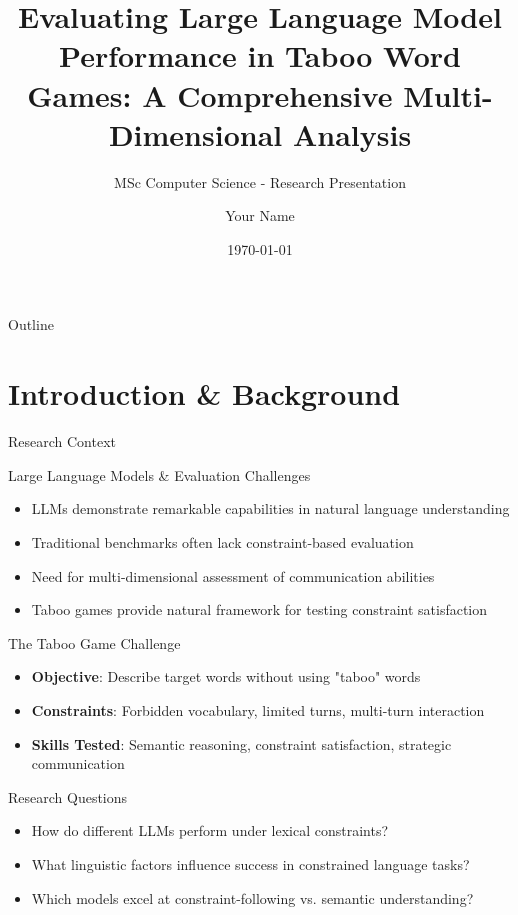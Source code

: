 \documentclass[aspectratio=169]{beamer}
\title[LLM Performance in Taboo Games]{Evaluating Large Language Model Performance in Taboo Word Games: A Comprehensive Multi-Dimensional Analysis}
\subtitle{MSc Computer Science - Research Presentation}
\author{Your Name}
\institute{University Name}
\date{\today}
\begin{document}
\begin{frame}
\titlepage
\end{frame}

\begin{frame}{Outline}
\tableofcontents
\end{frame}

\section{Introduction \& Background}

\begin{frame}{Research Context}
\begin{block}{Large Language Models \& Evaluation Challenges}
\begin{itemize}
    \item LLMs demonstrate remarkable capabilities in natural language understanding
    \item Traditional benchmarks often lack constraint-based evaluation
    \item Need for multi-dimensional assessment of communication abilities
    \item Taboo games provide natural framework for testing constraint satisfaction
\end{itemize}
\end{block}

\begin{block}{The Taboo Game Challenge}
\begin{itemize}
    \item \textbf{Objective}: Describe target words without using "taboo" words
    \item \textbf{Constraints}: Forbidden vocabulary, limited turns, multi-turn interaction
    \item \textbf{Skills Tested}: Semantic reasoning, constraint satisfaction, strategic communication
\end{itemize}
\end{block}

\begin{block}{Research Questions}
\begin{itemize}
    \item How do different LLMs perform under lexical constraints?
    \item What linguistic factors influence success in constrained language tasks?
    \item Which models excel at constraint-following vs. semantic understanding?
\end{itemize}
\end{block}
\end{frame}
\end{document}
